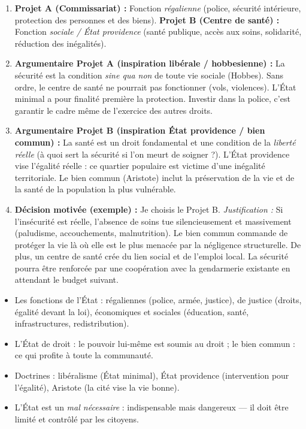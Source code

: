 \documentclass[11pt]{article}
\newcommand{\cle}[1]{{\popxbold\color{popdark}#1}}
\begin{document}
\begin{corrige}
\begin{enumerate}
\item \textbf{Projet A (Commissariat) :} Fonction \emph{régalienne} (police, sécurité intérieure, protection des personnes et des biens). \textbf{Projet B (Centre de santé) :} Fonction \emph{sociale / État providence} (santé publique, accès aux soins, solidarité, réduction des inégalités).
\item \textbf{Argumentaire Projet A (inspiration libérale / hobbesienne) :} La sécurité est la condition \emph{sine qua non} de toute vie sociale (Hobbes). Sans ordre, le centre de santé ne pourrait pas fonctionner (vols, violences). L'État minimal a pour finalité première la protection. Investir dans la police, c'est garantir le cadre même de l'exercice des autres droits.
\item \textbf{Argumentaire Projet B (inspiration État providence / bien commun) :} La santé est un droit fondamental et une condition de la \emph{liberté réelle} (à quoi sert la sécurité si l'on meurt de soigner ?). L'État providence vise l'égalité réelle : ce quartier populaire est victime d'une inégalité territoriale. Le bien commun (Aristote) inclut la préservation de la vie et de la santé de la population la plus vulnérable.
\item \textbf{Décision motivée (exemple) :} Je choisis le Projet B. \emph{Justification :} Si l'insécurité est réelle, l'absence de soins tue silencieusement et massivement (paludisme, accouchements, malnutrition). Le bien commun commande de protéger la vie là où elle est le plus menacée par la négligence structurelle. De plus, un centre de santé crée du lien social et de l'emploi local. La sécurité pourra être renforcée par une coopération avec la gendarmerie existante en attendant le budget suivant.
\end{enumerate}
\end{corrige}

\begin{aretenir}
\begin{itemize}
\item Les fonctions de l'État : régaliennes (police, armée, justice), de justice (droits, égalité devant la loi), économiques et sociales (éducation, santé, infrastructures, redistribution).
\item L'\cle{État de droit} : le pouvoir lui-même est soumis au droit ; le \cle{bien commun} : ce qui profite à toute la communauté.
\item Doctrines : libéralisme (État minimal), État providence (intervention pour l'égalité), Aristote (la cité vise la vie bonne).
\item L'État est un \emph{mal nécessaire} : indispensable mais dangereux — il doit être limité et contrôlé par les citoyens.
\end{itemize}
\end{aretenir}
\end{document}
